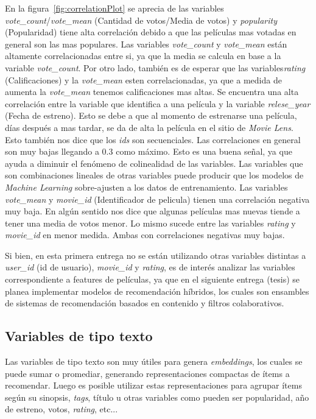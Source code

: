 \documentclass[11pt,a4paper,twoside]{thesis}
\begin{document}
En la figura~\ref{fig:correlationPlot} se aprecia de las variables
\textit{vote\_count}/\textit{vote\_mean} (Cantidad de votos/Media de votos) y
\textit{popularity} (Popularidad) tiene alta correlación debido a que las
películas mas votadas en general son las mas populares. Las variables
\textit{vote\_count} y \textit{vote\_mean} están altamente correlacionadas
entre si, ya que la media se calcula en base a la variable
\textit{vote\_count}. Por otro lado, también es de esperar que las
variables\textit{rating} (Calificaciones) y la \textit{vote\_mean} esten
correlacionadas, ya que a medida de aumenta la \textit{vote\_mean} tenemos
calificaciones mas altas. Se encuentra una alta correlación entre la variable
que identifica a una película y la variable \textit{relese\_year} (Fecha de
estreno). Esto se debe a que al momento de estrenarse una película, días
después a mas tardar, se da de alta la película en el sitio de \textit{Movie
	Lens}. Esto también nos dice que los \textit{ids} son secuenciales. Las
correlaciones en general son muy bajas llegando a $0.3$ como máximo. Esto es
una buena señal, ya que ayuda a diminuir el fenómeno de colinealidad de las
variables. Las variables que son combinaciones lineales de otras variables
puede producir que los modelos de \textit{Machine Learning} sobre-ajusten a los
datos de entrenamiento. Las variables \textit{vote\_mean} y \textit{movie\_id}
(Identificador de pelicula) tienen una correlación negativa muy baja. En algún
sentido nos dice que algunas películas mas nuevas tiende a tener una media de
votos menor. Lo mismo sucede entre las variables \textit{rating} y
\textit{movie\_id} en menor medida. Ambas con correlaciones negativas muy
bajas.

Si bien, en esta primera entrega no se están utilizando otras variables
distintas a \textit{user\_id} (id de usuario), \textit{movie\_id} y
\textit{rating}, es de interés analizar las variables correspondiente a
features de películas, ya que en el siguiente entrega (tesis) se planea
implementar modelos de recomendación híbridos, los cuales son ensambles de
sistemas de recomendación basados en contenido y filtros colaborativos.

\subsection{Variables de tipo texto}

Las variables de tipo texto son muy útiles para genera \textit{embeddings}, los
cuales se puede sumar o promediar, generando representaciones compactas de
ítems a recomendar. Luego es posible utilizar estas representaciones para
agrupar ítems según su sinopsis, \textit{tags}, título u otras variables como
pueden ser popularidad, año de estreno, votos, \textit{rating}, etc...
\end{document}

